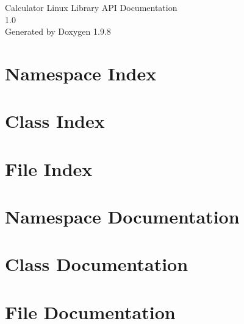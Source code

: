 \documentclass[twoside]{book}
\newcommand{\+}{\discretionary{\mbox{\scriptsize$\hookleftarrow$}}{}{}}
\newcommand{\clearemptydoublepage}{%
    \newpage{\pagestyle{empty}\cleardoublepage}%
  }
\begin{document}
  \raggedbottom
    \hypersetup{pageanchor=false,
                bookmarksnumbered=true,
                pdfencoding=unicode
               }
  \begin{titlepage}
  \vspace*{7cm}
  \begin{center}%
  {\Large Calculator Linux Library API Documentation}\\
  [1ex]\large 1.\+0 \\
  \vspace*{1cm}
  {\large Generated by Doxygen 1.9.8}\\
  \end{center}
  \end{titlepage}
  \clearemptydoublepage
  \tableofcontents
  \clearemptydoublepage
  \hypersetup{pageanchor=true}

\chapter{Namespace Index}

\chapter{Class Index}

\chapter{File Index}

\chapter{Namespace Documentation}



\chapter{Class Documentation}



\chapter{File Documentation}















  \backmatter
  \newpage
  \clearemptydoublepage
  \printindex
\end{document}
